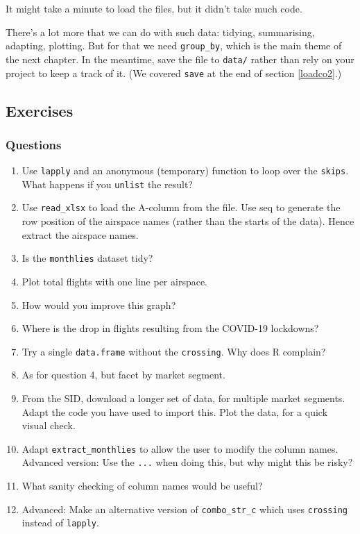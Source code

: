 \documentclass[
]{book}
\providecommand{\tightlist}{%
  \setlength{\itemsep}{0pt}\setlength{\parskip}{0pt}}
\begin{document}
It might take a minute to load the files, but it didn't take much code.

There's a lot more that we can do with such data: tidying, summarising, adapting, plotting. But for that we need \texttt{group\_by}, which is the main theme of the next chapter. In the meantime, save the file to \texttt{data/} rather than rely on your project to keep a track of it. (We covered \texttt{save} at the end of section \ref{loadco2}.)

\hypertarget{exercises-4}{%
\subsection{Exercises}\label{exercises-4}}

\hypertarget{questions-7}{%
\subsubsection{Questions}\label{questions-7}}

\begin{enumerate}
\def\labelenumi{\arabic{enumi})}
\tightlist
\item
  Use \texttt{lapply} and an anonymous (temporary) function to loop over the \texttt{skips}. What happens if you \texttt{unlist} the result?
\item
  Use \texttt{read\_xlsx} to load the A-column from the file. Use seq to generate the row position of the airspace names (rather than the starts of the data). Hence extract the airspace names.
\item
  Is the \texttt{monthlies} dataset tidy?
\item
  Plot total flights with one line per airspace.
\item
  How would you improve this graph?
\item
  Where is the drop in flights resulting from the COVID-19 lockdowns?
\item
  Try a single \texttt{data.frame} without the \texttt{crossing}. Why does R complain?
\item
  As for question 4, but facet by market segment.
\item
  From the SID, download a longer set of data, for multiple market segments. Adapt the code you have used to import this. Plot the data, for a quick visual check.
\item
  Adapt \texttt{extract\_monthlies} to allow the user to modify the column names. Advanced version: Use the \texttt{...} when doing this, but why might this be risky?
\item
  What sanity checking of column names would be useful?
\item
  Advanced: Make an alternative version of \texttt{combo\_str\_c} which uses \texttt{crossing} instead of \texttt{lapply}.
\end{enumerate}
\end{document}
